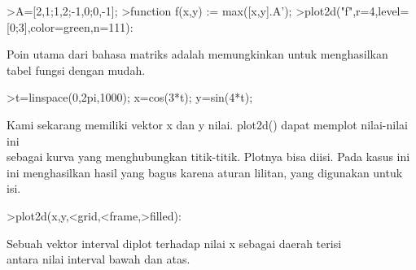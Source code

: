 \documentclass{article}
\begin{document}
\begin{eulernotebook}
\begin{eulercomment}
\begin{eulercomment}
\begin{eulercomment}
\begin{eulercomment}
\begin{eulerprompt}
>A=[2,1;1,2;-1,0;0,-1];
>function f(x,y) := max([x,y].A');
>plot2d("f",r=4,level=[0;3],color=green,n=111):
\end{eulerprompt}
\begin{eulercomment}
Poin utama dari bahasa matriks adalah memungkinkan untuk menghasilkan
tabel fungsi dengan mudah.
\end{eulercomment}
\begin{eulerprompt}
>t=linspace(0,2pi,1000); x=cos(3*t); y=sin(4*t);
\end{eulerprompt}
\begin{eulercomment}
Kami sekarang memiliki vektor x dan y nilai. plot2d() dapat memplot
nilai-nilai ini\\
sebagai kurva yang menghubungkan titik-titik. Plotnya bisa diisi. Pada
kasus ini\\
ini menghasilkan hasil yang bagus karena aturan lilitan, yang
digunakan untuk\\
isi.
\end{eulercomment}
\begin{eulerprompt}
>plot2d(x,y,<grid,<frame,>filled):
\end{eulerprompt}
\begin{eulercomment}
Sebuah vektor interval diplot terhadap nilai x sebagai daerah terisi\\
antara nilai interval bawah dan atas.


\end{eulercomment}
\end{eulercomment}
\end{eulercomment}
\end{eulercomment}
\end{eulercomment}
\end{eulernotebook}
\end{document}
